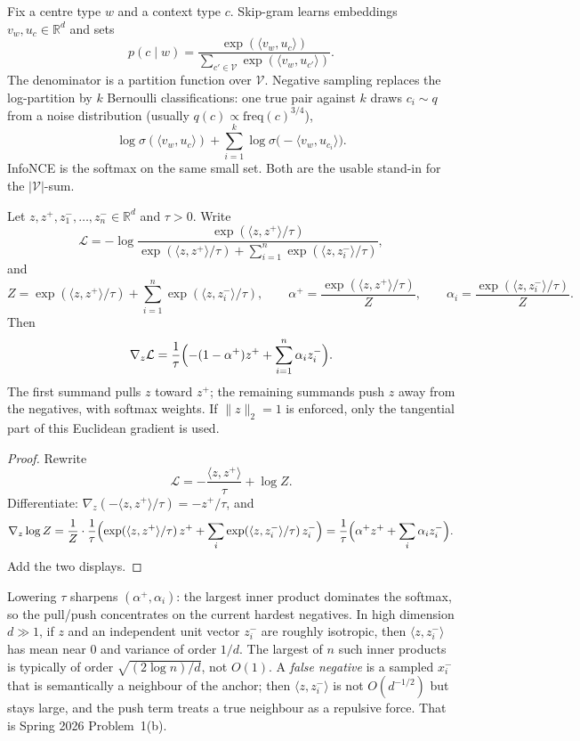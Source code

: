 \begin{definition}
\label{def:nlpu-skipgram}
Fix a centre type $w$ and a context type $c$. Skip-gram learns embeddings $v_w,u_c\in\mathbb{R}^d$ and sets
\[
p(c\mid w)
=
\frac{\exp(\langle v_w,u_c\rangle)}{\sum_{c'\in\mathcal{V}}\exp(\langle v_w,u_{c'}\rangle)}.
\]
The denominator is a partition function over $\mathcal{V}$. Negative sampling replaces the log-partition by $k$ Bernoulli classifications: one true pair against $k$ draws $c_i\sim q$ from a noise distribution (usually $q(c)\propto\mathrm{freq}(c)^{3/4}$),
\[
\log\sigma(\langle v_w,u_c\rangle)
+
\sum_{i=1}^k
\log\sigma\bigl(-\langle v_w,u_{c_i}\rangle\bigr).
\]
InfoNCE is the softmax on the same small set. Both are the usable stand-in for the $|\mathcal{V}|$-sum.
\end{definition}

\begin{proposition}
\label{prop:nlpu-infonce}
Let $z,z^+,z_1^-,\dots,z_n^-\in\mathbb{R}^d$ and $\tau>0$. Write
\[
\mathcal{L}
=
-\log\frac{\exp(\langle z,z^+\rangle/\tau)}{\exp(\langle z,z^+\rangle/\tau)+\sum_{i=1}^n\exp(\langle z,z_i^-\rangle/\tau)},
\]
and
\[
Z
=
\exp(\langle z,z^+\rangle/\tau)+\sum_{i=1}^n\exp(\langle z,z_i^-\rangle/\tau),
\qquad
\alpha^+
=
\frac{\exp(\langle z,z^+\rangle/\tau)}{Z},
\qquad
\alpha_i
=
\frac{\exp(\langle z,z_i^-\rangle/\tau)}{Z}.
\]
Then
\[
\nabla_z\mathcal{L}
=
\frac1\tau\Bigl(-(1-\alpha^+)z^++\sum_{i=1}^n\alpha_i z_i^-\Bigr).
\]
The first summand pulls $z$ toward $z^+$; the remaining summands push $z$ away from the negatives, with softmax weights. If $\|z\|_2=1$ is enforced, only the tangential part of this Euclidean gradient is used.
\end{proposition}

\begin{proof}
Rewrite
\[
\mathcal{L}
=
-\frac{\langle z,z^+\rangle}{\tau}
+
\log Z.
\]
Differentiate: $\nabla_z(-\langle z,z^+\rangle/\tau)=-z^+/\tau$, and
\[
\nabla_z\log Z
=
\frac1Z\cdot\frac1\tau\Bigl(\exp(\langle z,z^+\rangle/\tau)\,z^++\sum_i\exp(\langle z,z_i^-\rangle/\tau)\,z_i^-\Bigr)
=
\frac1\tau\Bigl(\alpha^+ z^++\sum_i\alpha_i z_i^-\Bigr).
\]
Add the two displays.
\end{proof}

\begin{remark}
\label{rem:nlpu-infonce-hd}
Lowering $\tau$ sharpens $(\alpha^+,\alpha_i)$: the largest inner product dominates the softmax, so the pull/push concentrates on the current hardest negatives. In high dimension $d\gg 1$, if $z$ and an independent unit vector $z_i^-$ are roughly isotropic, then $\langle z,z_i^-\rangle$ has mean near $0$ and variance of order $1/d$. The largest of $n$ such inner products is typically of order $\sqrt{(2\log n)/d}$, not $O(1)$. A \emph{false negative} is a sampled $x_i^-$ that is semantically a neighbour of the anchor; then $\langle z,z_i^-\rangle$ is not $O(d^{-1/2})$ but stays large, and the push term treats a true neighbour as a repulsive force. That is Spring 2026 Problem~1(b).
\end{remark}

